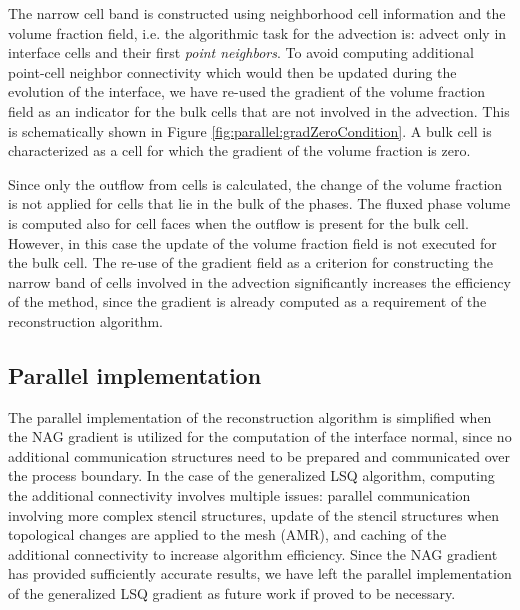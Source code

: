 The narrow cell band is constructed using neighborhood cell information and the
volume fraction field, i.e. the algorithmic task for the advection is: advect
only in interface cells and their first \emph{point neighbors}. To avoid
computing additional point-cell neighbor connectivity which would then be
updated during the evolution of the interface, we have re-used the gradient of
the volume fraction field as an indicator for the bulk cells that are not
involved in the advection. This is schematically shown in Figure
\ref{fig:parallel:gradZeroCondition}.  A bulk cell is  characterized as a cell
for which the gradient of the volume fraction is zero.

Since only the outflow from cells is calculated, the change of the volume
fraction is not applied for cells that lie in the bulk of the phases.  The
fluxed phase volume is computed also for cell faces when the outflow is
present for the bulk cell. However, in this case the update of the volume
fraction field is not executed for the bulk cell. The re-use of the gradient
field as a criterion for constructing the narrow band of cells involved in the
advection significantly increases the efficiency of the method, since the
gradient is already computed as a requirement of the reconstruction algorithm.

\subsection{Parallel implementation}

The parallel implementation of the reconstruction algorithm is simplified when
the NAG gradient is utilized for the computation of the interface normal, since
no additional communication structures need to be prepared and communicated
over the process boundary. In the case of the generalized LSQ algorithm,
computing the additional connectivity involves multiple issues: parallel
communication involving more complex stencil structures, update of the stencil
structures when topological changes are applied to the mesh (AMR), and caching
of the additional connectivity to increase algorithm efficiency. Since the NAG
gradient has provided sufficiently accurate results, we have left the parallel
implementation of the generalized LSQ gradient as future work if proved to be
necessary.

